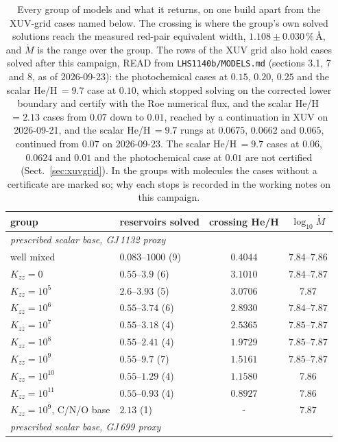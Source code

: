 \documentclass[english,a4paper]{my_memo}
\begin{document}
\begin{table}[htbp]\centering\small
\caption{Every group of models and what it returns, on one build apart from
the XUV-grid cases named below. The
crossing is where the group's own solved solutions reach the measured
red-pair equivalent width, $1.108 \pm 0.030$\,\%\,\AA, and $\dot M$ is the
range over the group. The rows of the XUV grid also hold cases solved after
this campaign, READ from \texttt{LHS1140b/MODELS.md} (sections 3.1, 7 and 8,
as of 2026-09-23): the photochemical cases at $0.15$, $0.20$, $0.25$ and the
scalar He/H\,$=9.7$ case at $0.10$, which stopped solving on the corrected
lower boundary and certify with the Roe numerical flux, and the scalar
He/H\,$=2.13$ cases from $0.07$ down to $0.01$, reached by a continuation in
XUV on 2026-09-21, and the scalar He/H\,$=9.7$ rungs at $0.0675$, $0.0662$ and
$0.065$, continued from $0.07$ on 2026-09-23. The scalar He/H\,$=9.7$ cases at
$0.06$, $0.0624$ and $0.01$ and the photochemical case at
$0.01$ are not certified (Sect.~\ref{sec:xuvgrid}). In the groups with molecules the cases
without a certificate are marked so; why each stops is recorded in the
working notes on this campaign.}
\label{tab:campaign}
\begin{tabular}{llcc}
\toprule
group & reservoirs solved & crossing He/H & $\log_{10}\dot M$ \\
\midrule
\multicolumn{4}{l}{\emph{prescribed scalar base, GJ\,1132 proxy}}\\
well mixed & $0.083$--$1000$ (9) & $0.4044$ & $7.84$--$7.86$ \\
$K_{zz} = 0$ & $0.55$--$3.9$ (6) & $3.1010$ & $7.84$--$7.87$ \\
$K_{zz} = 10^{5}$ & $2.6$--$3.93$ (5) & $3.0706$ & $7.87$ \\
$K_{zz} = 10^{6}$ & $0.55$--$3.74$ (6) & $2.8930$ & $7.84$--$7.87$ \\
$K_{zz} = 10^{7}$ & $0.55$--$3.18$ (4) & $2.5365$ & $7.85$--$7.87$ \\
$K_{zz} = 10^{8}$ & $0.55$--$2.41$ (4) & $1.9729$ & $7.85$--$7.87$ \\
$K_{zz} = 10^{9}$ & $0.55$--$9.7$ (7) & $1.5161$ & $7.85$--$7.87$ \\
$K_{zz} = 10^{10}$ & $0.55$--$1.29$ (4) & $1.1580$ & $7.86$ \\
$K_{zz} = 10^{11}$ & $0.55$--$0.93$ (4) & $0.8927$ & $7.86$ \\
$K_{zz} = 10^{9}$, C/N/O base & $2.13$ (1) & - & $7.87$ \\
\midrule
\multicolumn{4}{l}{\emph{prescribed scalar base, GJ\,699 proxy}}\\

\end{tabular}
\end{table}
\end{document}
